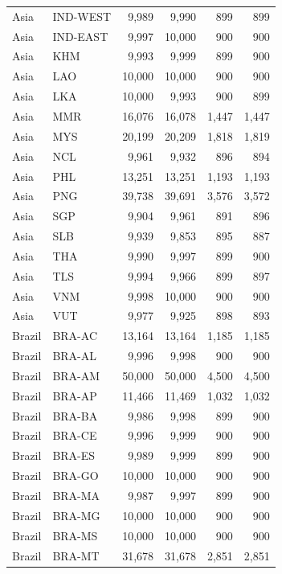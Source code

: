 \documentclass[12pt,]{article}
\begin{document}
\begin{longtable}[t]{llrrrr}
Asia & IND-WEST & 9,989 & 9,990 & 899 & 899\\
\rowcolor{gray!6}  Asia & IND-EAST & 9,997 & 10,000 & 900 & 900\\
Asia & KHM & 9,993 & 9,999 & 899 & 900\\
\rowcolor{gray!6}  Asia & LAO & 10,000 & 10,000 & 900 & 900\\
Asia & LKA & 10,000 & 9,993 & 900 & 899\\
\rowcolor{gray!6}  Asia & MMR & 16,076 & 16,078 & 1,447 & 1,447\\
Asia & MYS & 20,199 & 20,209 & 1,818 & 1,819\\
\rowcolor{gray!6}  Asia & NCL & 9,961 & 9,932 & 896 & 894\\
Asia & PHL & 13,251 & 13,251 & 1,193 & 1,193\\
\rowcolor{gray!6}  Asia & PNG & 39,738 & 39,691 & 3,576 & 3,572\\
Asia & SGP & 9,904 & 9,961 & 891 & 896\\
\rowcolor{gray!6}  Asia & SLB & 9,939 & 9,853 & 895 & 887\\
Asia & THA & 9,990 & 9,997 & 899 & 900\\
\rowcolor{gray!6}  Asia & TLS & 9,994 & 9,966 & 899 & 897\\
Asia & VNM & 9,998 & 10,000 & 900 & 900\\
\rowcolor{gray!6}  Asia & VUT & 9,977 & 9,925 & 898 & 893\\
Brazil & BRA-AC & 13,164 & 13,164 & 1,185 & 1,185\\
\rowcolor{gray!6}  Brazil & BRA-AL & 9,996 & 9,998 & 900 & 900\\
Brazil & BRA-AM & 50,000 & 50,000 & 4,500 & 4,500\\
\rowcolor{gray!6}  Brazil & BRA-AP & 11,466 & 11,469 & 1,032 & 1,032\\
Brazil & BRA-BA & 9,986 & 9,998 & 899 & 900\\
\rowcolor{gray!6}  Brazil & BRA-CE & 9,996 & 9,999 & 900 & 900\\
Brazil & BRA-ES & 9,989 & 9,999 & 899 & 900\\
\rowcolor{gray!6}  Brazil & BRA-GO & 10,000 & 10,000 & 900 & 900\\
Brazil & BRA-MA & 9,987 & 9,997 & 899 & 900\\
\rowcolor{gray!6}  Brazil & BRA-MG & 10,000 & 10,000 & 900 & 900\\
Brazil & BRA-MS & 10,000 & 10,000 & 900 & 900\\
\rowcolor{gray!6}  Brazil & BRA-MT & 31,678 & 31,678 & 2,851 & 2,851\\

\end{longtable}
\end{document}
